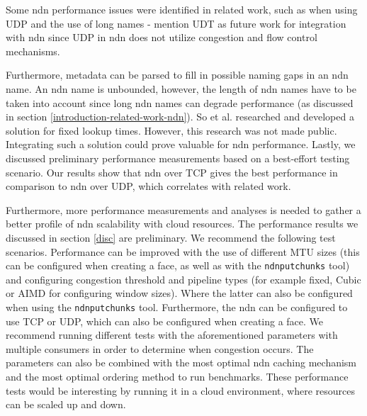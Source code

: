Some \gls{ndn} performance issues were identified in related work, such as when using UDP and the use of long names - mention UDT as future work for integration with \gls{ndn} since UDP in \gls{ndn} does not utilize congestion and flow control mechanisms.

Furthermore, metadata can be parsed to fill in possible naming gaps in an \gls{ndn} name. An \gls{ndn} name is unbounded, however, the length of \gls{ndn} names have to be taken into account since long \gls{ndn} names can degrade performance (as discussed in section \ref{introduction-related-work-ndn}). So et al. researched and developed a solution for fixed lookup times. However, this research was not made public. Integrating such a solution could prove valuable for \gls{ndn} performance. Lastly, we discussed preliminary performance measurements based on a best-effort testing scenario. Our results show that \gls{ndn} over TCP gives the best performance in comparison to \gls{ndn} over UDP, which correlates with related work.

Furthermore, more performance measurements and analyses is needed to gather a better profile of \gls{ndn} scalability with cloud resources. The performance results we discussed in section \ref{disc} are preliminary. We recommend the following test scenarios. Performance can be improved with the use of different MTU sizes (this can be configured when creating a face, as well as with the \texttt{ndnputchunks} tool) and configuring congestion threshold and pipeline types (for example fixed, Cubic or AIMD for configuring window sizes). Where the latter can also be configured when using the \texttt{ndnputchunks} tool. Furthermore, the \gls{ndn} can be configured to use TCP or UDP, which can also be configured when creating a face. We recommend running different tests with the aforementioned parameters with multiple consumers in order to determine when congestion occurs. The parameters can also be combined with the most optimal \gls{ndn} caching mechanism and the most optimal ordering method \cite{koulouzis2018information} to run benchmarks. These performance tests would be interesting by running it in a cloud environment, where resources can be scaled up and down.


